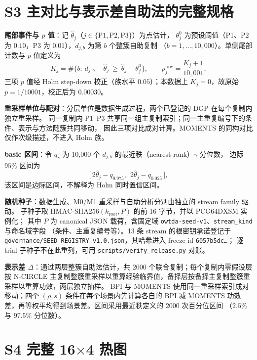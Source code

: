 \documentclass[UTF8,zihao=-4]{ctexart}
\theoremstyle{remark}
\begin{document}
\section*{S3 主对比与表示差自助法的完整规格}

\textbf{尾部事件与 $p$ 值}：记 $\widehat\theta_j$（$j\in\{\mathrm{P1},\mathrm{P2},\mathrm{P3}\}$）为点估计，
$\theta_j^{0}$ 为预设阈值（P1、P2 为 $0.10$，P3 为 $0.01$），$d_{j,b}$ 为第 $b$ 个整簇自助复制
（$b=1,\ldots,10{,}000$）。单侧尾部计数与 $p$ 值定义为
\[
 K_j=\#\bigl\{b:\ d_{j,b}-\widehat\theta_j\ \ge\ \widehat\theta_j-\theta_j^{0}\bigr\},
 \qquad
 p_j^{\mathrm{raw}}=\frac{K_j+1}{10{,}001},
\]
三项 $p$ 值经 Holm step-down 校正（族水平 $0.05$）；本数据上 $K_j=0$，故原始 $p=1/10001$，校正后为 $0.00030$。

\textbf{重采样单位与配对}：分层单位是数据生成过程，两个已登记的 DGP 在每个复制内独立重采样。
同一复制内 P1--P3 共享同一组主复制索引；同一主重复编号下的条件、表示与方法随簇共同移动，
因此三项对比成对计算。MOMENTS 的同构对比仅作次级描述，不进入 Holm 族。

\textbf{basic 区间}：令 $q_\gamma$ 为 10{,}000 个 $d_{j,b}$ 的最近秩（nearest-rank）$\gamma$ 分位数，
边际 $95\%$ 区间为
\[
 \bigl[\,2\widehat\theta_j-q_{0.975},\ \ 2\widehat\theta_j-q_{0.025}\,\bigr],
\]
该区间是边际区间，不解释为 Holm 同时置信区间。

\textbf{随机种子}：数据生成、M0/M1 重采样与自助分析分别由独立的 stream family 驱动。
子种子取 $\mathrm{HMAC\text{-}SHA256}(k_{\mathrm{root}},P)$ 的前 16 字节，并以 $\mathrm{PCG64DXSM}$ 实例化；
其中 $P$ 为 canonical JSON 载荷，含固定域 \texttt{owtda-seed-v1}、\texttt{stream\_kind} 与命名域字段
（条件、主重复编号等）。13 条 stream 的根密钥承诺登记于
\texttt{governance/SEED\_REGISTRY\_v1.0.json}，其哈希进入 freeze id \texttt{6057b5dc\ldots}；
逐 trial 子种子不在此重列，可用 \texttt{scripts/verify\_release.py} 对账。

\textbf{表示差 $\Delta$}：通过两层整簇自助法估计，共 2000 个联合复制；每个复制内零假设层按
N-CIRCLE 主复制整簇重采样以重算经验临界值，备择层按备择主复制整簇重采样以重算功效，两层独立抽样。
BPI 与 MOMENTS 使用同一重采样索引成对移动；四个 $(\rho,s)$ 条件在每个场景内先计算各自的
BPI 减 MOMENTS 功效差，再等权平均得到场景差。区间采用最近秩定义的 2000 次百分位区间
（$2.5\%$ 与 $97.5\%$ 分位数）。

\section*{S4 完整 16$\times$4 热图}
\end{document}

